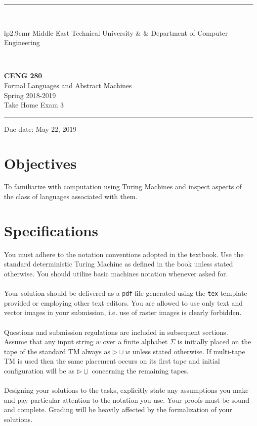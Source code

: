 \documentclass[fleqn,12pt]{article}
\newcommand{\HRule}{\rule{\linewidth}{1mm}}
\begin{document}
\noindent
\HRule \\[3mm]
\small
\begin{tabular}[b]{lp{2.9cm}r}
{} Middle East Technical University &  &
{} Department of Computer Engineering \\
\end{tabular} \\
\begin{center}

                 \LARGE \textbf{CENG 280} \\[4mm]
                 \Large Formal Languages and Abstract Machines \\[4mm]
                \normalsize Spring 2018-2019 \\
                    \Large Take Home Exam 3
\end{center}
\HRule

\begin{center}
Due date: May 22, 2019
\end{center}

\section*{Objectives}
To familiarize with computation using Turing Machines and inspect aspects of the class of languages associated with them.
\\

\section*{Specifications}

You must adhere to the notation conventions adopted in the textbook. Use the standard deterministic Turing Machine as defined in the book unless stated otherwise. You should utilize basic machines notation whenever asked for.
\\
\\
Your solution should be delivered as a \texttt{pdf} file generated using the \texttt{tex} template provided or employing other text editors. You are allowed to use only text and vector images in your submission, i.e. use of raster images is clearly forbidden.
\\
\\
Questions and submission regulations are included in subsequent sections. Assume that any input string $w$ over a finite alphabet $\Sigma$ is initially placed on the tape of the standard TM always as $\triangleright\underline{\sqcup} w$ unless stated otherwise. If multi-tape TM is used then the same placement occurs on its first tape and initial configuration will be as $\triangleright\underline{\sqcup}$ concerning the remaining tapes. 
\\
\\
Designing your solutions to the tasks, explicitly state any assumptions you make and pay particular attention to the notation you use. Your proofs must be sound and complete. Grading will be heavily affected by the formalization of your solutions.
\end{document}
